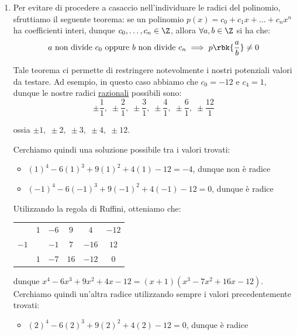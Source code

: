 \documentclass[a4paper, 12pt]{report}
\begin{document}
    \begin{enumerate}
        \item Per evitare di procedere a casaccio nell'individuare le radici del polinomio, sfruttiamo il seguente teorema: se un polinomio $p(x) = c_0 + c_1x + \ldots + c_nx^n$ ha coefficienti interi, dunque $c_0, \ldots, c_n \in \Z$, allora $\forall a,b \in \Z$ si ha che:
        \[a \text{ non divide } c_0 \text{ oppure } b \text{ non divide } c_n \implies p\rbk{\frac{a}{b}} \neq 0\]

        Tale teorema ci permette di restringere notevolmente i nostri potenziali valori da testare. Ad esempio, in questo caso abbiamo che $c_0 = -12$ e $c_4 = 1$, dunque le nostre radici \underline{razionali} possibili sono:
        \[\pm \frac{1}{1}, \; \pm \frac{2}{1}, \; \pm \frac{3}{1}, \; \pm\frac{4}{1}, \; \pm\frac{6}{1}, \; \pm\frac{12}{1}\] 

        ossia $\pm 1, \; \pm 2, \; \pm 3, \; \pm 4, \; \pm 12$.

        Cerchiamo quindi una soluzione possibile tra i valori trovati:
        \begin{itemize}
            \item $(1)^4-6(1)^3+9(1)^2+4(1)-12 = -4$, dunque non è radice
            \item $(-1)^4-6(-1)^3+9(-1)^2+4(-1)-12 = 0$, dunque è radice
        \end{itemize}
        
        Utilizzando la regola di Ruffini, otteniamo che:
        \begin{center}
            \begin{tabular}{c | c c c c | c}
                 & $1$ & $-6$ & $9$ & $4$ & $-12$\\
            $-1$ &       & $-1$ & $7$ & $-16$& $12$\\
            \hline
                & $1$ & $-7$ & $16$ & $-12$ & $0$ \\
            \end{tabular}
        \end{center}

        dunque $x^4-6x^3+9x^2+4x-12 = (x+1)(x^3-7x^2+16x-12)$. Cerchiamo quindi un'altra radice utilizzando sempre i valori precedentemente trovati:
        \begin{itemize}
            \item $(2)^4-6(2)^3+9(2)^2+4(2)-12 = 0$, dunque è radice
        \end{itemize}


\end{enumerate}
\end{document}
